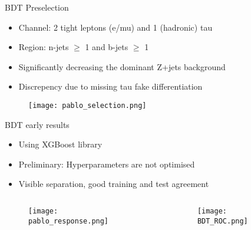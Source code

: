 

\begin{frame}{BDT Preselection}
    \begin{itemize}
        \item Channel: 2 tight leptons (e/mu) and 1 (hadronic) tau
        \item Region: n-jets $\ge$ 1 and b-jets $\ge$ 1
        \item Significantly decreasing the dominant Z+jets background
        \item Discrepency due to missing tau fake differentiation
    \end{itemize}
    \begin{figure}
        \texttt{[image: pablo\_selection.png]}
    \end{figure}
\end{frame}

\begin{frame}{BDT early results}
    \begin{itemize}
        \item Using XGBoost library
        \item Preliminary: Hyperparameters are not optimised
        \item Visible separation, good training and test agreement
    \end{itemize}
    \begin{columns}
        \begin{column}{0.5\textwidth}
            \begin{figure}
                \texttt{[image: pablo\_response.png]}
            \end{figure}           
        \end{column}
        \begin{column}{0.5\textwidth}
            \begin{figure}
                \texttt{[image: BDT\_ROC.png]}
            \end{figure}            
        \end{column}
    \end{columns}

\end{frame}

